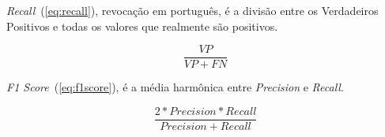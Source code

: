 \textit{Recall}~(\ref{eq:recall}), revocação em português, é a divisão entre os Verdadeiros Positivos e todas os valores que realmente são positivos.

\begin{equation}
    \label{eq:recall}
    \frac{VP}{VP + FN}
\end{equation}

\textit{F1 Score}~(\ref{eq:f1score}), é a média harmônica entre \textit{Precision} e \textit{Recall}.

\begin{equation}
    \label{eq:f1score}
    \frac{2 * Precision * Recall}{Precision + Recall}
\end{equation}



